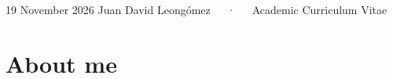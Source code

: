 \documentclass[11pt,a4paper,]{awesome-cv}
\begin{document}
\makecvheader

\makecvfooter
  {19 November 2026}
    {Juan David Leongómez~~~·~~~Academic Curriculum Vitae}
  {\thepage}





\section{About me}\label{about-me}
\end{document}
